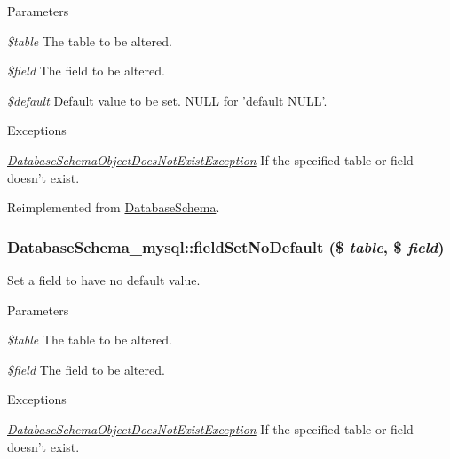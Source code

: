 \begin{DoxyParams}{Parameters}
\item[{\em \$table}]The table to be altered. \item[{\em \$field}]The field to be altered. \item[{\em \$default}]Default value to be set. NULL for 'default NULL'.\end{DoxyParams}

\begin{DoxyExceptions}{Exceptions}
\item[{\em \hyperlink{classDatabaseSchemaObjectDoesNotExistException}{DatabaseSchemaObjectDoesNotExistException}}]If the specified table or field doesn't exist. \end{DoxyExceptions}


Reimplemented from \hyperlink{classDatabaseSchema_a0e7b9c13344b59584bf6e1ddea009592}{DatabaseSchema}.\hypertarget{classDatabaseSchema__mysql_abf4208a396175d211decc395ea6cc63f}{
\subsubsection[{fieldSetNoDefault}]{\setlength{\rightskip}{0pt plus 5cm}DatabaseSchema\_\-mysql::fieldSetNoDefault (\$ {\em table}, \/  \$ {\em field})}}
\label{classDatabaseSchema__mysql_abf4208a396175d211decc395ea6cc63f}
Set a field to have no default value.


\begin{DoxyParams}{Parameters}
\item[{\em \$table}]The table to be altered. \item[{\em \$field}]The field to be altered.\end{DoxyParams}

\begin{DoxyExceptions}{Exceptions}
\item[{\em \hyperlink{classDatabaseSchemaObjectDoesNotExistException}{DatabaseSchemaObjectDoesNotExistException}}]If the specified table or field doesn't exist. \end{DoxyExceptions}


